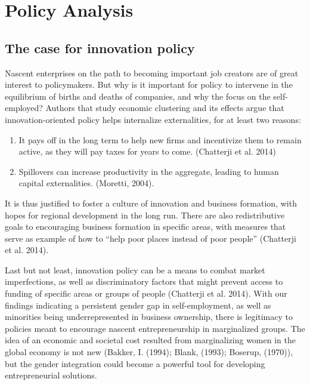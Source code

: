 \chapter{Policy Analysis\label{ch:policy}}

\section{The case for innovation policy}

Nascent enterprises on the path to becoming important job creators are of great interest to policymakers. But why is it important for policy to intervene in the equilibrium of births and deaths of companies, and why the focus on the self-employed? Authors that study economic clustering and its effects argue that innovation-oriented policy helps internalize externalities, for at least two reasons: 

\renewcommand{\labelenumi}{\roman{enumi}}
\begin{enumerate}
\item It pays off in the long term to help new firms and incentivize them to remain active, as they will pay taxes for years to come. (Chatterji et al. 2014) 
\item Spillovers can increase productivity in the aggregate, leading to human capital externalities. (Moretti, 2004). 
\end{enumerate}

It is thus justified to foster a culture of innovation and business formation, with hopes for regional development in the long run. There are also redistributive goals to encouraging business formation in specific areas, with measures that serve as example of how to ``help poor places instead of poor people'' (Chatterji et al. 2014). 

Last but not least, innovation policy can be a means to combat market imperfections, as well as discriminatory factors that might prevent access to funding of specific areas or groups of people (Chatterji et al. 2014). With our findings indicating a persistent gender gap in self-employment, as well as minorities being underrepresented in business ownership, there is legitimacy to policies meant to encourage nascent entrepreneurship in marginalized groups. The idea of an economic and societal cost resulted from marginalizing women in the global economy is not new (Bakker, I. (1994); Blank, (1993); Boserup, (1970)), but the  gender integration could become a powerful tool for developing entrepreneurial solutions.  

